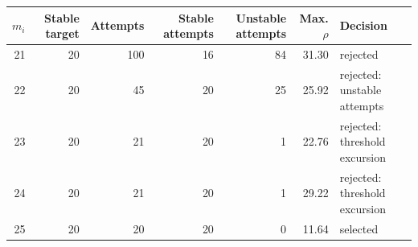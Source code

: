 \begin{tabular}{rrrrrrl}
\toprule
$m_i$ & Stable target & Attempts & Stable attempts & Unstable attempts & Max. $\rho$ & Decision \\
\midrule
21 & 20 & 100 & 16 & 84 & 31.30 & rejected \\
22 & 20 & 45 & 20 & 25 & 25.92 & rejected: unstable attempts \\
23 & 20 & 21 & 20 & 1 & 22.76 & rejected: threshold excursion \\
24 & 20 & 21 & 20 & 1 & 29.22 & rejected: threshold excursion \\
25 & 20 & 20 & 20 & 0 & 11.64 & selected \\
\bottomrule
\end{tabular}
